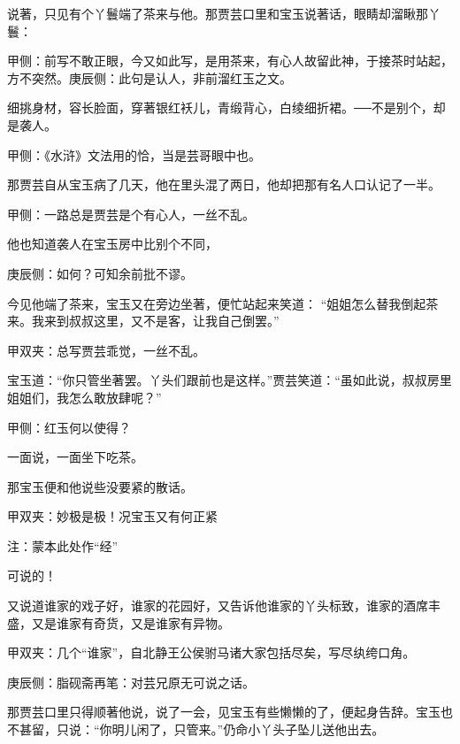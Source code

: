 \begin{parag}
    说著，只见有个丫鬟端了茶来与他。那贾芸口里和宝玉说著话，眼睛却溜瞅那丫鬟：\begin{note}甲侧：前写不敢正眼，今又如此写，是用茶来，有心人故留此神，于接茶时站起，方不突然。庚辰侧：此句是认人，非前溜红玉之文。\end{note}细挑身材，容长脸面，穿著银红袄儿，青缎背心，白绫细折裙。──不是别个，却是袭人。\begin{note}甲侧：《水浒》文法用的恰，当是芸哥眼中也。\end{note}那贾芸自从宝玉病了几天，他在里头混了两日，他却把那有名人口认记了一半。\begin{note}甲侧：一路总是贾芸是个有心人，一丝不乱。\end{note}他也知道袭人在宝玉房中比别个不同，\begin{note}庚辰侧：如何？可知余前批不谬。\end{note}今见他端了茶来，宝玉又在旁边坐著，便忙站起来笑道： “姐姐怎么替我倒起茶来。我来到叔叔这里，又不是客，让我自己倒罢。”\begin{note}甲双夹：总写贾芸乖觉，一丝不乱。\end{note}宝玉道：“你只管坐著罢。丫头们跟前也是这样。”贾芸笑道：“虽如此说，叔叔房里姐姐们，我怎么敢放肆呢？”\begin{note}甲侧：红玉何以使得？\end{note}一面说，一面坐下吃茶。
\end{parag}


\begin{parag}
    那宝玉便和他说些没要紧的散话。\begin{note}甲双夹：妙极是极！况宝玉又有何正紧\begin{subnote}注：蒙本此处作“经”\end{subnote}可说的！\end{note}又说道谁家的戏子好，谁家的花园好，又告诉他谁家的丫头标致，谁家的酒席丰盛，又是谁家有奇货，又是谁家有异物。\begin{note}甲双夹：几个“谁家”，自北静王公侯驸马诸大家包括尽矣，写尽纨绔口角。\end{note}\begin{note}庚辰侧：脂砚斋再笔：对芸兄原无可说之话。\end{note}那贾芸口里只得顺著他说，说了一会，见宝玉有些懒懒的了，便起身告辞。宝玉也不甚留，只说：“你明儿闲了，只管来。”仍命小丫头子坠儿送他出去。
\end{parag}


